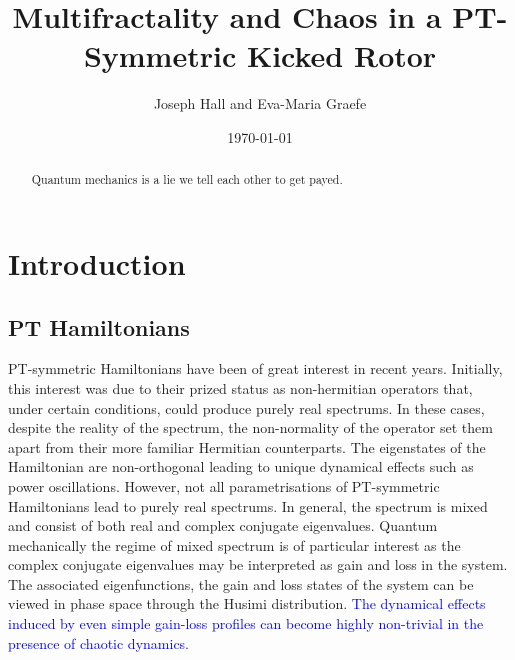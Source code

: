 \documentclass{iopart}
\begin{document}
	
	\title{Multifractality and Chaos in a  PT-Symmetric Kicked Rotor}
	\date{\today}
	\author{Joseph Hall and Eva-Maria Graefe}
	\address{Department of Mathematics, Imperial College London, London, SW7 2AZ, United Kingdom}
	
	\begin{abstract}
	Quantum mechanics is a lie we tell each other to get payed.
	\end{abstract}
	\maketitle
	

	\section{Introduction}

	\subsection{PT Hamiltonians}
	PT-symmetric Hamiltonians have been of great interest in recent years. Initially, this interest was due to their prized status as non-hermitian operators that, under certain conditions, could produce purely real spectrums. In these cases, despite the reality of the spectrum, the non-normality of the operator set them apart from their more familiar Hermitian counterparts. The eigenstates of the Hamiltonian are non-orthogonal leading to unique dynamical effects such as power oscillations. However, not all parametrisations of PT-symmetric Hamiltonians lead to purely real spectrums. In general, the spectrum is mixed and consist of both real and complex conjugate eigenvalues. Quantum mechanically the regime of mixed spectrum is of particular interest as the complex conjugate eigenvalues may be interpreted as gain and loss in the system. The associated eigenfunctions, the gain and loss states of the system can be viewed in phase space through the Husimi distribution. 
	\textcolor{blue}{The dynamical effects induced by even simple gain-loss profiles can become highly non-trivial in the presence of chaotic dynamics. }
\end{document}
